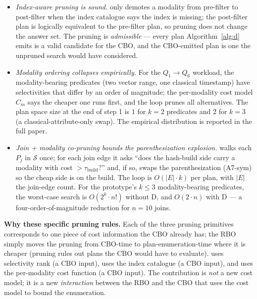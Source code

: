 \documentclass[sigconf,nonacm,review]{acmart}
\theoremstyle{plain}
\theoremstyle{definition}
\theoremstyle{remark}
\begin{document}
\begin{itemize}[leftmargin=*]
  \item \emph{Index-aware pruning is sound.}
   only demotes a modality from
  pre-filter to post-filter when the index catalogue says the
  index is missing; the post-filter plan is logically equivalent
  to the pre-filter plan, so pruning does not change the answer
  set. The pruning is \emph{admissible} --- every plan
  Algorithm~\ref{alg:d} emits is a valid candidate for the CBO,
  and the CBO-emitted plan is one the unpruned search would
  have considered.
  \item \emph{Modality ordering collapses empirically.}
  For the $Q_1 \to Q_6$ workload, the modality-bearing
  predicates (two vector range, one classical timestamp) have
  selectivities that differ by an order of magnitude; the
  per-modality cost model $C_m$ says the cheaper one runs
  first, and the  loop prunes all
  alternatives. The plan space size at the end of step 1 is
  $1$ for $k = 2$ predicates and $2$ for $k = 3$ (a
  classical-attribute-only swap). The empirical distribution
  is reported in the full paper.
  \item \emph{Join + modality co-pruning bounds the
  parenthesization explosion.}
   walks each $P_j$ in
  $\mathcal{S}$ once; for each join edge it asks ``does the
  hash-build side carry a modality with cost
  $> \tau_{\mathrm{build}}$?'' and, if so, swaps the
  parenthesization (A7-sym) so the cheap side is on the
  build. The loop is $O(|E| \cdot k)$ per plan, with
  $|E|$ the join-edge count. For the prototype's
  $k \le 3$ modality-bearing predicates, the worst-case
  search is $O(2^k \cdot n!)$ without D, and $O(2 \cdot n)$
  with D --- a four-order-of-magnitude reduction for
  $n = 10$ joins.
\end{itemize}

\noindent\textbf{Why these specific pruning rules.}
Each of the three pruning primitives corresponds to one
piece of cost information the CBO already has; the RBO simply
moves the pruning from CBO-time to plan-enumeration-time
where it is cheaper (pruning rules out plans the CBO would
have to evaluate).  uses selectivity
rank (a CBO input),  uses the index
catalogue (a CBO input), and 
uses the per-modality cost function (a CBO input). The
contribution is \emph{not} a new cost model; it is a new
\emph{interaction} between the RBO and the CBO that uses the
cost model to bound the enumeration.
\end{document}
